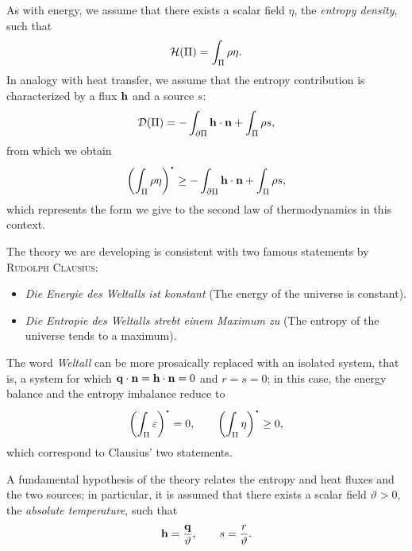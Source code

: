 As with energy, we assume that there exists a scalar field $\eta$, the \textit{entropy density}, such that
\begin{equation}
	\mathcal{H}(\Pi)=\int_{\Pi}\rho\eta.
\end{equation}
In analogy with heat transfer, we assume that the entropy contribution is characterized by a flux $\mathbf{h}$ and a source $s$:
\begin{equation}
	\mathcal{D}(\Pi)=-\int_{\partial\Pi}\mathbf{h} \cdot \mathbf{n} +\int_{\Pi} \rho s,
\end{equation}
from which we obtain
\begin{equation}\label{sbentr}
	\left( \int_{\Pi}\rho\eta \right)^{\mathop{\vcenter{\hbox{\Large$\cdot$}}}}\geq -\int_{\partial\Pi}\hb \cdot \nb +\int_{\Pi} \rho s,
\end{equation}
which represents the form we give to the second law of thermodynamics in this context.

\begin{remark}
	The theory we are developing is consistent with two famous statements by \textsc{Rudolph Clausius}:
	\begin{itemize}
		\item \textit{Die Energie des Weltalls ist konstant } (The energy of the universe is constant).
		\item \textit{Die Entropie des Weltalls strebt einem Maximum zu} (The entropy of the universe tends to a maximum).
	\end{itemize}
	The word \textit{Weltall} can be more prosaically replaced with an isolated system, that is, a system for which $\mathbf{q} \cdot \mathbf{n} = \mathbf{h} \cdot \mathbf{n} = 0$ and $r = s = 0$; in this case, the energy balance and the entropy imbalance reduce to
	\begin{equation}
		\left(\int_{\Pi}\varepsilon\right)^{\mathop{\vcenter{\hbox{\Large$\cdot$}}}}=0, \qquad \left( \int_{\Pi}\eta \right)^{\mathop{\vcenter{\hbox{\Large$\cdot$}}}}\geq 0,
	\end{equation}
	which correspond to Clausius' two statements.
\end{remark}

A fundamental hypothesis of the theory relates the entropy and heat fluxes and the two sources; in particular, it is assumed that there exists a scalar field $\vartheta>0$, the \textit{absolute temperature}, such that
\begin{equation}
	\mathbf{h} =\frac{\mathbf{q}}{\vartheta}, \qquad s=\frac{r}{\vartheta}.
\end{equation}

